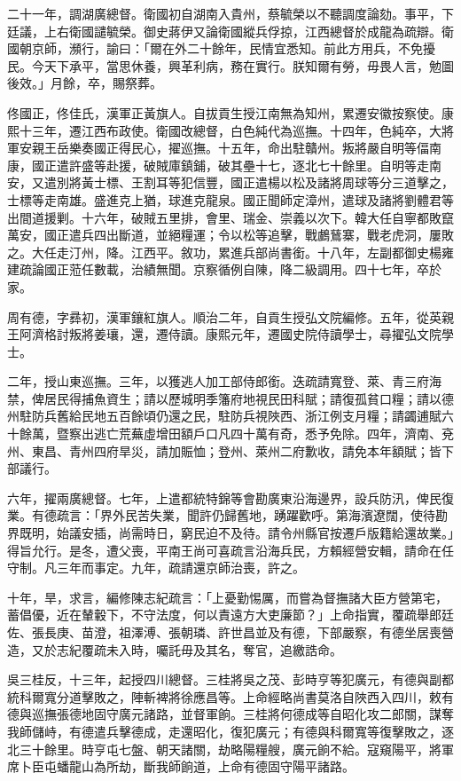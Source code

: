 \begin{pinyinscope}
二十一年，調湖廣總督。衛國初自湖南入貴州，蔡毓榮以不聽調度論劾。事平，下廷議，上右衛國譴毓榮。御史蔣伊又論衛國縱兵俘掠，江西總督於成龍為疏辯。衛國朝京師，瀕行，諭曰：「爾在外二十餘年，民情宜悉知。前此方用兵，不免擾民。今天下承平，當思休養，興革利病，務在實行。朕知爾有勞，毋畏人言，勉圖後效。」月餘，卒，賜祭葬。

佟國正，佟佳氏，漢軍正黃旗人。自拔貢生授江南無為知州，累遷安徽按察使。康熙十三年，遷江西布政使。衛國改總督，白色純代為巡撫。十四年，色純卒，大將軍安親王岳樂奏國正得民心，擢巡撫。十五年，命出駐贛州。叛將嚴自明等偪南康，國正遣許盛等赴援，破賊庫鎮鋪，破其壘十七，逐北七十餘里。自明等走南安，又遣別將黃士標、王割耳等犯信豐，國正遣楊以松及諸將周球等分三道擊之，士標等走南雄。盛進克上猶，球進克龍泉。國正聞師定漳州，遣球及諸將劉體君等出間道援剿。十六年，破賊五里排，會里、瑞金、崇義以次下。韓大任自寧都敗竄萬安，國正遣兵四出斷道，並絕糧運；令以松等追擊，戰鸕鶿寨，戰老虎洞，屢敗之。大任走汀州，降。江西平。敘功，累進兵部尚書銜。十八年，左副都御史楊雍建疏論國正蒞任數載，治績無聞。京察循例自陳，降二級調用。四十七年，卒於家。

周有德，字彞初，漢軍鑲紅旗人。順治二年，自貢生授弘文院編修。五年，從英親王阿濟格討叛將姜瓖，還，遷侍讀。康熙元年，遷國史院侍讀學士，尋擢弘文院學士。

二年，授山東巡撫。三年，以獲逃人加工部侍郎銜。迭疏請寬登、萊、青三府海禁，俾居民得捕魚資生；請以歷城明季籓府地視民田科賦；請復孤貧口糧；請以德州駐防兵舊給民地五百餘頃仍還之民，駐防兵視陜西、浙江例支月糧；請蠲逋賦六十餘萬，暨察出逃亡荒蕪虛增田額戶口凡四十萬有奇，悉予免除。四年，濟南、兗州、東昌、青州四府旱災，請加賑恤；登州、萊州二府歉收，請免本年額賦；皆下部議行。

六年，擢兩廣總督。七年，上遣都統特錦等會勘廣東沿海邊界，設兵防汛，俾民復業。有德疏言：「界外民苦失業，聞許仍歸舊地，踴躍歡呼。第海濱遼闊，使待勘界既明，始議安插，尚需時日，窮民迫不及待。請令州縣官按遷戶版籍給還故業。」得旨允行。是冬，遭父喪，平南王尚可喜疏言沿海兵民，方賴經營安輯，請命在任守制。凡三年而事定。九年，疏請還京師治喪，許之。

十年，旱，求言，編修陳志紀疏言：「上憂勤惕厲，而嘗為督撫諸大臣方營第宅，蓄倡優，近在輦轂下，不守法度，何以責遠方大吏廉節？」上命指實，覆疏舉郎廷佐、張長庚、苗澄，祖澤溥、張朝璘、許世昌並及有德，下部嚴察，有德坐居喪營造，又於志紀覆疏未入時，囑託毋及其名，奪官，追繳誥命。

吳三桂反，十三年，起授四川總督。三桂將吳之茂、彭時亨等犯廣元，有德與副都統科爾寬分道擊敗之，陣斬裨將徐應昌等。上命經略尚書莫洛自陜西入四川，敕有德與巡撫張德地固守廣元諸路，並督軍餉。三桂將何德成等自昭化攻二郎關，謀奪我師儲峙，有德遣兵擊德成，走還昭化，復犯廣元；有德與科爾寬等復擊敗之，逐北三十餘里。時亨屯七盤、朝天諸關，劫略陽糧艘，廣元餉不給。寇窺陽平，將軍席卜臣屯蟠龍山為所劫，斷我師餉道，上命有德固守陽平諸路。


\end{pinyinscope}
